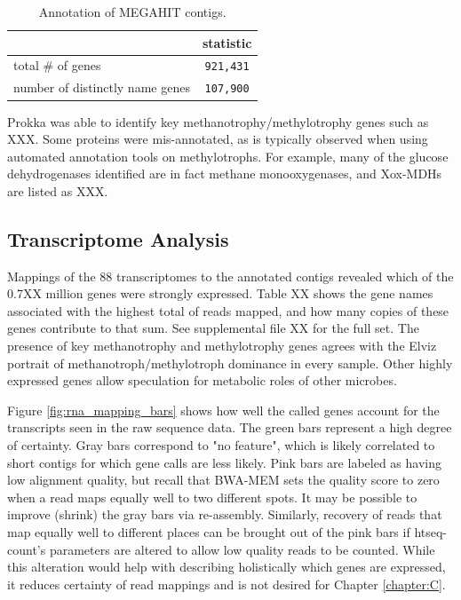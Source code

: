 \begin{table}[H]
\centering
\begin{singlespace}
\caption[Annotation of MEGAHIT contigs]
	{Annotation of MEGAHIT contigs.}
\begin{tabular}{l | c}
        & statistic  \\
\midrule
	total \# of genes & \texttt{921,431} \\ %
	number of distinctly name genes & \texttt{107,900} \\
\end{tabular}
\label{table:annotation}
\end{singlespace}
\end{table}


Prokka was able to identify key methanotrophy/methylotrophy genes such as XXX.
Some proteins were mis-annotated, as is typically observed when using automated annotation tools on methylotrophs.
For example, many of the glucose dehydrogenases identified are in fact methane monooxygenases, and Xox-MDHs are listed as XXX.



\subsection{Transcriptome Analysis}

Mappings of the 88 transcriptomes to the annotated contigs revealed which of the 0.7XX million genes were strongly expressed.
Table XX shows the gene names associated with the highest total of reads mapped, and how many copies of these genes contribute to that sum.
See supplemental file XX for the full set.
The presence of key methanotrophy and methylotrophy genes agrees with the Elviz portrait of methanotroph/methylotroph dominance in every sample.
Other highly expressed genes allow speculation for metabolic roles of other microbes.


Figure \ref{fig:rna_mapping_bars} shows how well the called genes account for the transcripts seen in the raw sequence data.
The green bars represent a high degree of certainty.
Gray bars correspond to "no feature", which is likely correlated to short contigs for which gene calls are less likely.
Pink bars are labeled as having low alignment quality, but recall that BWA-MEM sets the quality score to zero when a read maps equally well to two different spots.
It may be possible to improve (shrink) the gray bars via re-assembly.
Similarly, recovery of reads that map equally well to different places can be brought out of the pink bars if htseq-count's parameters are altered to allow low quality reads to be counted.
While this alteration would help with describing holistically which genes are expressed, it reduces certainty of read mappings and is not desired for Chapter \ref{chapter:C}.


